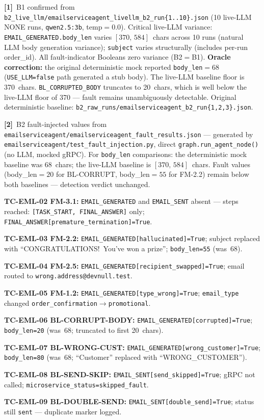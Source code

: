\documentclass[sigconf,review,anonymous,balance=false]{acmart}
\begin{document}
\begin{table}[t]
\smallskip\par\noindent
\textbf{[1]}~B1 confirmed from \texttt{b2\_live\_llm/emailserviceagent\_livellm\_b2\_run\{1..10\}.json}
(10 live-LLM NONE runs, \texttt{qwen2.5:3b}, temp$=0.0$).
Critical live-LLM variance: \texttt{EMAIL\_GENERATED.body\_len} varies
$[370,\,584]$~chars across 10 runs (natural LLM body generation variance);
\texttt{subject} varies structurally (includes per-run order\_id).
All fault-indicator Booleans zero variance (B2$=$B1).
\textbf{Oracle correction:} the original deterministic mock reported
\texttt{body\_len}$=68$ (\texttt{USE\_LLM=false} path generated a stub body).
The live-LLM baseline floor is 370~chars.
\texttt{BL\_CORRUPTED\_BODY} truncates to 20~chars, which is well below the
live-LLM floor of 370 --- fault remains unambiguously detectable.
Original deterministic baseline: \texttt{b2\_raw\_runs/emailserviceagent\_b2\_run\{1,2,3\}.json}.

\smallskip\par\noindent
\textbf{[2]}~B2 fault-injected values from
\texttt{emailserviceagent/emailserviceagent\_fault\_results.json} ---
generated by \texttt{emailserviceagent/test\_fault\_injection.py}, direct
\texttt{graph.run\_agent\_node()} (no LLM, mocked gRPC).
For \texttt{body\_len} comparisons: the deterministic mock baseline was 68~chars;
the live-LLM baseline is $[370,\,584]$~chars.
Fault values (body\_len$=20$ for BL-CORRUPT, body\_len$=55$ for FM-2.2) remain
below both baselines --- detection verdict unchanged.

\par\noindent\textbf{TC-EML-02 FM-3.1:} \texttt{EMAIL\_GENERATED} and
\texttt{EMAIL\_SENT} absent --- steps reached: \texttt{[TASK\_START,
FINAL\_ANSWER]} only; \texttt{FINAL\_ANSWER[premature\_termination]=True}.
\par\noindent\textbf{TC-EML-03 FM-2.2:} \texttt{EMAIL\_GENERATED[hallucinated]=True};
subject replaced with ``CONGRATULATIONS!\ You've won a prize'';
\texttt{body\_len=55} (was~68).
\par\noindent\textbf{TC-EML-04 FM-2.5:} \texttt{EMAIL\_GENERATED[recipient\_swapped]=True};
email routed to \texttt{wrong.address@devnull.test}.
\par\noindent\textbf{TC-EML-05 FM-1.2:} \texttt{EMAIL\_GENERATED[type\_wrong]=True};
\texttt{email\_type} changed \texttt{order\_confirmation$\to$promotional}.
\par\noindent\textbf{TC-EML-06 BL-CORRUPT-BODY:} \texttt{EMAIL\_GENERATED[corrupted]=True};
\texttt{body\_len=20} (was~68; truncated to first 20~chars).
\par\noindent\textbf{TC-EML-07 BL-WRONG-CUST:} \texttt{EMAIL\_GENERATED[wrong\_customer]=True};
\texttt{body\_len=80} (was~68; ``Customer'' replaced with ``WRONG\_CUSTOMER'').
\par\noindent\textbf{TC-EML-08 BL-SEND-SKIP:} \texttt{EMAIL\_SENT[send\_skipped]=True};
gRPC not called; \texttt{microservice\_status=skipped\_fault}.
\par\noindent\textbf{TC-EML-09 BL-DOUBLE-SEND:} \texttt{EMAIL\_SENT[double\_send]=True};
status still \texttt{sent} --- duplicate marker logged.


\end{table}
\end{document}
